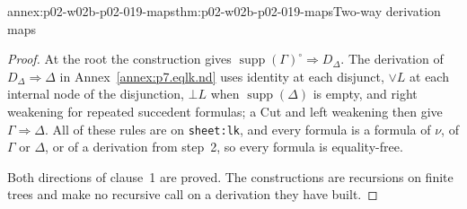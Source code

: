 \begin{annexitem}{annex:p02-w02b-p02-019-maps}{thm:p02-w02b-p02-019-maps}{Two-way derivation maps}
\begin{proof}
At the root the construction gives
\(\operatorname{supp}(\Gamma)^{\circ}\Rightarrow D_{\Delta}\).  The
derivation of \(D_{\Delta}\Rightarrow\Delta\) in
Annex~\ref{annex:p7.eqlk.nd} uses identity at each disjunct, \(\lor L\) at
each internal node of the disjunction, \(\bot L\) when
\(\operatorname{supp}(\Delta)\) is empty, and right weakening for repeated
succedent formulas; a Cut and left weakening then give
\(\Gamma\Rightarrow\Delta\).  All of these rules are on \texttt{sheet:lk},
and every formula is a formula of \(\nu\), of \(\Gamma\) or \(\Delta\), or of
a derivation from step~2, so every formula is equality-free.

Both directions of clause~1 are proved.  The constructions are recursions on
finite trees and make no recursive call on a derivation they have built.
\end{proof}
\end{annexitem}

